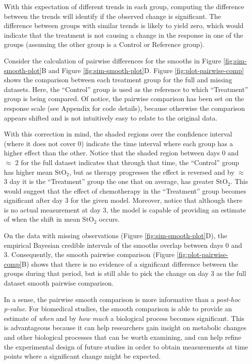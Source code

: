 \documentclass[
]{article}
\begin{document}
With this expectation of different trends in each group, computing the difference between the trends will identify if the observed change is significant. The difference between groups with similar trends is likely to yield zero, which would indicate that the treatment is not causing a change in the response in one of the groups (assuming the other group is a Control or Reference group).

Consider the calculation of pairwise differences for the smooths in Figure \ref{fig:sim-smooth-plot}B and Figure \ref{fig:sim-smooth-plot}D. Figure \ref{fig:plot-pairwise-comp} shows the comparison between each treatment group for the full and missing datasets. Here, the ``Control'' group is used as the reference to which ``Treatment'' group is being compared. Of notice, the pairwise comparison has been set on the response scale (see Appendix for code details), because otherwise the comparison appears shifted and is not intuitively easy to relate to the original data.

With this correction in mind, the shaded regions over the confidence interval (where it does not cover 0) indicate the time interval where each group has a higher effect than the other. Notice that the shaded region between days 0 and \(\approx\) 2 for the full dataset indicates that through that time, the ``Control'' group has higher mean \(\mbox{StO}_2\), but as therapy progresses the effect is reversed and by \(\approx\) 3 day it is the ``Treatment'' group the one that on average, has greater \(\mbox{StO}_2\). This would suggest that the effect of chemotherapy in the ``Treatment'' group becomes significant after day 3 for the given model. Moreover, notice that although there is no actual measurement at day 3, the model is capable of providing an estimate of when the shift in mean \(\mbox{StO}_2\) occurs.

On the data with missing observations (Figure \ref{fig:sim-smooth-plot}D), the empirical Bayesian credible intervals of the smooths overlap between days 0 and 3. Consequently, the smooth pairwise comparison (Figure \ref{fig:plot-pairwise-comp}B) shows that there is no evidence of a significant difference between the groups during that period, but is still able to pick the change on day 3 as the full dataset smooth pairwise comparison.

In a sense, the pairwise smooth comparison is more informative than a \emph{post-hoc} \emph{p-value}. For biomedical studies, the smooth comparison is able to provide an estimate of \emph{when} and by \emph{how much} a biological process becomes significant. This is advantageous because it can help researchers gain insight on metabolic changes and other biological processes that can be worth examining, and can help refine the experimental design of future studies in order to obtain measurements at time points where a significant change might be expected.
\end{document}

